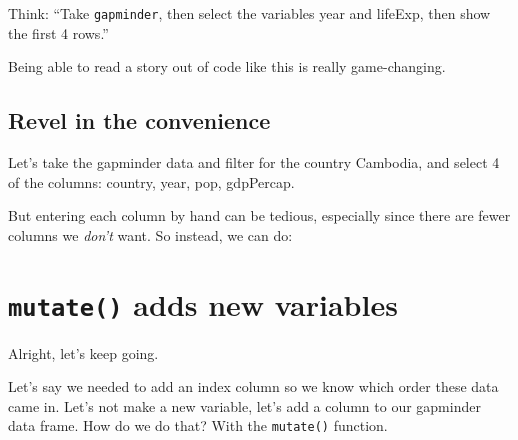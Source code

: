 \documentclass[]{book}
\newenvironment{Shaded}{\begin{snugshade}}{\end{snugshade}}
\newcommand{\KeywordTok}[1]{\textcolor[rgb]{0.13,0.29,0.53}{\textbf{#1}}}
\newcommand{\StringTok}[1]{\textcolor[rgb]{0.31,0.60,0.02}{#1}}
\newcommand{\CommentTok}[1]{\textcolor[rgb]{0.56,0.35,0.01}{\textit{#1}}}
\newcommand{\OperatorTok}[1]{\textcolor[rgb]{0.81,0.36,0.00}{\textbf{#1}}}
\newcommand{\NormalTok}[1]{#1}
\theoremstyle{definition}
\theoremstyle{definition}
\theoremstyle{definition}
\theoremstyle{remark}
\begin{document}
Think: ``Take \texttt{gapminder}, then select the variables year and
lifeExp, then show the first 4 rows.''

Being able to read a story out of code like this is really
game-changing.

\subsection{Revel in the convenience}\label{revel-in-the-convenience}

Let's take the gapminder data and filter for the country Cambodia, and
select 4 of the columns: country, year, pop, gdpPercap.

\begin{Shaded}
\end{Shaded}

But entering each column by hand can be tedious, especially since there
are fewer columns we \emph{don't} want. So instead, we can do:

\begin{Shaded}
\end{Shaded}

\section{\texorpdfstring{\texttt{mutate()} adds new
variables}{mutate() adds new variables}}\label{mutate-adds-new-variables}

Alright, let's keep going.

Let's say we needed to add an index column so we know which order these
data came in. Let's not make a new variable, let's add a column to our
gapminder data frame. How do we do that? With the \texttt{mutate()}
function.
\end{document}
